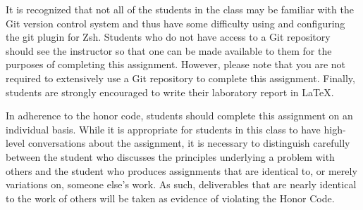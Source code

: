 It is recognized that not all of the students in the class may be familiar with the Git version
control system and thus have some difficulty using and configuring the git plugin for Zsh. Students
who do not have access to a Git repository should see the instructor so that one can be made
available to them for the purposes of completing this assignment. However, please note that you
are not required to extensively use a Git repository to complete this assignment. Finally, students
are strongly encouraged to write their laboratory report in \LaTeX.

In adherence to the honor code, students should complete this assignment on an individual
basis. While it is appropriate for students in this class to have high-level conversations about the
assignment, it is necessary to distinguish carefully between the student who discusses the principles
underlying a problem with others and the student who produces assignments that are identical to,
or merely variations on, someone else’s work. As such, deliverables that are nearly identical to the
work of others will be taken as evidence of violating the Honor Code.



